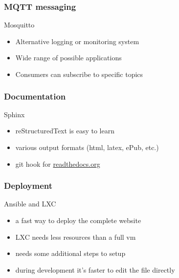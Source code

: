 %
\begin{frame}
\frametitle{MQTT messaging}
%
\begin{center}
{\Large Mosquitto}
\end{center}
\vspace{1cm}
%
\begin{itemize}
  \item Alternative logging or monitoring system
  \item Wide range of possible applications
  \item Consumers can subscribe to specific topics
\end{itemize}
\end{frame}
%
\begin{frame}
\frametitle{Documentation}
%
\begin{center}
{\Large Sphinx}
\end{center}
\vspace{1cm}
%
\begin{itemize}
  \item reStructuredText is easy to learn
  \item various output formats (html, latex, ePub, etc.)
  \item git hook for \href{https://readthedocs.org/}{readthedocs.org}
\end{itemize}
\end{frame}
%
\begin{frame}
\frametitle{Deployment}
%
\begin{center}
{\Large Ansible and LXC}
\end{center}
\vspace{1cm}
%
\begin{itemize}
  \item a fast way to deploy the complete website
  \item LXC needs less resources than a full vm
  \item needs some additional steps to setup
  \item during development it's faster to edit the file directly
\end{itemize}
\end{frame}

